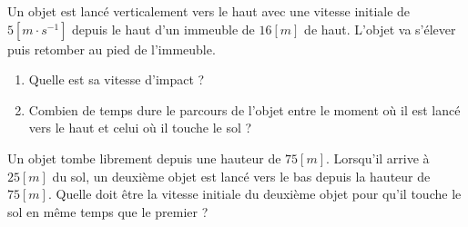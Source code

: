 \begin{exercise}
  Un objet est lancé verticalement vers le haut avec une vitesse initiale de \(5[m \cdot s^{-1}]\) depuis le haut d'un immeuble de \(16\unit{[m]}\) de haut. L'objet va s'élever puis retomber au pied de l'immeuble.
  \begin{enumerate}[label=\alph*)]
    \item        Quelle est sa vitesse d'impact ?
    \item       Combien de temps dure le parcours de l'objet entre le moment où il est lancé vers le haut et celui où il touche le sol ?
  \end{enumerate}
\end{exercise}

\begin{exercise}
  Un objet tombe librement depuis une hauteur de \(75\unit{[m]}\). Lorsqu'il arrive à \(25 \unit{[m]}\) du sol, un deuxième objet est lancé vers le bas depuis la hauteur de \(75\unit{[m]}\). Quelle doit être la vitesse initiale du deuxième objet pour qu'il touche le sol en même temps que le premier ?
\end{exercise}

\begin{exercise}
\end{exercise}
